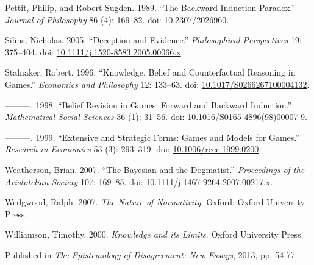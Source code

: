 \documentclass[
  11pt,
  letterpaper,
  DIV=11,
  numbers=noendperiod,
  twoside]{scrartcl}
\newlength{\cslhangindent}
\newenvironment{CSLReferences}[2] %
 {\begin{list}{}{%
  \setlength{\itemindent}{0pt}
  \setlength{\leftmargin}{0pt}
  \setlength{\parsep}{0pt}
  \ifodd #1
   \setlength{\leftmargin}{\cslhangindent}
   \setlength{\itemindent}{-1\cslhangindent}
  \fi
  \setlength{\itemsep}{#2\baselineskip}}}
 {\end{list}}
\begin{document}
\begin{CSLReferences}{1}{0}
Pettit, Philip, and Robert Sugden. 1989. {``The Backward Induction
Paradox.''} \emph{Journal of Philosophy} 86 (4): 169--82. doi:
\href{https://doi.org/10.2307/2026960}{10.2307/2026960}.

Silins, Nicholas. 2005. {``Deception and Evidence.''}
\emph{Philosophical Perspectives} 19: 375--404. doi:
\href{https://doi.org/10.1111/j.1520-8583.2005.00066.x}{10.1111/j.1520-8583.2005.00066.x}.

Stalnaker, Robert. 1996. {``Knowledge, Belief and Counterfactual
Reasoning in Games.''} \emph{Economics and Philosophy} 12: 133--63. doi:
\href{https://doi.org/10.1017/S0266267100004132}{10.1017/S0266267100004132}.

---------. 1998. {``Belief Revision in Games: Forward and Backward
Induction.''} \emph{Mathematical Social Sciences} 36 (1): 31--56. doi:
\href{https://doi.org/10.1016/S0165-4896(98)00007-9}{10.1016/S0165-4896(98)00007-9}.

---------. 1999. {``Extensive and Strategic Forms: Games and Models for
Games.''} \emph{Research in Economics} 53 (3): 293--319. doi:
\href{https://doi.org/10.1006/reec.1999.0200}{10.1006/reec.1999.0200}.

Weatherson, Brian. 2007. {``The Bayesian and the Dogmatist.''}
\emph{Proceedings of the Aristotelian Society} 107: 169--85. doi:
\href{https://doi.org/10.1111/j.1467-9264.2007.00217.x}{10.1111/j.1467-9264.2007.00217.x}.

Wedgwood, Ralph. 2007. \emph{The Nature of Normativity}. Oxford: Oxford
University Press.

Williamson, Timothy. 2000. \emph{{Knowledge and its Limits}}. Oxford
University Press.

\end{CSLReferences}



\noindent Published in\emph{
The Epistemology of Disagreement: New Essays}, 2013, pp. 54-77.
\end{document}
